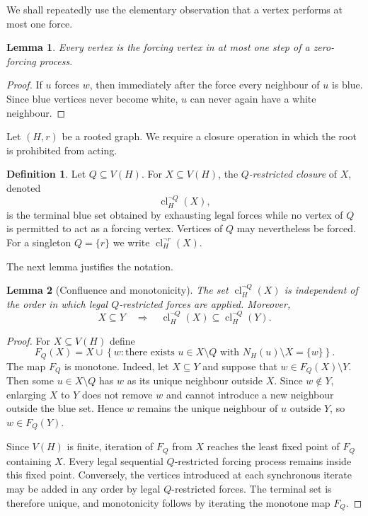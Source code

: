 \documentclass[11pt,reqno]{amsart}
\newtheorem{lemma}[lemma]{Lemma}
\theoremstyle{definition}
\newtheorem{definition}[definition]{Definition}
\newcommand{\cl}{\operatorname{cl}}
\begin{document}
We shall repeatedly use the elementary observation that a vertex performs at most one force.

\begin{lemma}\label{lem:one-force}
Every vertex is the forcing vertex in at most one step of a zero-forcing process.
\end{lemma}

\begin{proof}
If $u$ forces $w$, then immediately after the force every neighbour of $u$ is blue.  Since blue vertices never become white, $u$ can never again have a white neighbour.
\end{proof}

Let $(H,r)$ be a rooted graph.  We require a closure operation in which the root is prohibited from acting.

\begin{definition}
Let $Q\subseteq V(H)$.  For $X\subseteq V(H)$, the \emph{$Q$-restricted closure} of $X$, denoted
\[
  \cl_H^{\neg Q}(X),
\]
is the terminal blue set obtained by exhausting legal forces while no vertex of $Q$ is permitted to act as a forcing vertex.  Vertices of $Q$ may nevertheless be forced.  For a singleton $Q=\{r\}$ we write $\cl_H^{\neg r}(X)$.
\end{definition}

The next lemma justifies the notation.

\begin{lemma}[Confluence and monotonicity]\label{lem:closure}
The set $\cl_H^{\neg Q}(X)$ is independent of the order in which legal $Q$-restricted forces are applied.  Moreover,
\[
  X\subseteq Y
  \quad\Longrightarrow\quad
  \cl_H^{\neg Q}(X)\subseteq \cl_H^{\neg Q}(Y).
\]
\end{lemma}

\begin{proof}
For $X\subseteq V(H)$ define
\[
  F_Q(X)=X\cup
  \left\{
    w:\text{there exists }u\in X\setminus Q
    \text{ with }N_H(u)\setminus X=\{w\}
  \right\}.
\]
The map $F_Q$ is monotone.  Indeed, let $X\subseteq Y$ and suppose that $w\in F_Q(X)\setminus Y$.  Then some $u\in X\setminus Q$ has $w$ as its unique neighbour outside $X$.  Since $w\notin Y$, enlarging $X$ to $Y$ does not remove $w$ and cannot introduce a new neighbour outside the blue set.  Hence $w$ remains the unique neighbour of $u$ outside $Y$, so $w\in F_Q(Y)$.

Since $V(H)$ is finite, iteration of $F_Q$ from $X$ reaches the least fixed point of $F_Q$ containing $X$.  Every legal sequential $Q$-restricted forcing process remains inside this fixed point.  Conversely, the vertices introduced at each synchronous iterate may be added in any order by legal $Q$-restricted forces.  The terminal set is therefore unique, and monotonicity follows by iterating the monotone map $F_Q$.
\end{proof}
\end{document}
